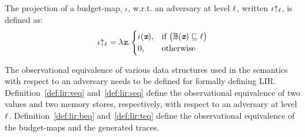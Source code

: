 \begin{mydef}
\label{def:lir:bmp}
The projection of a budget-map, $\iota$, w.r.t. an adversary at
level $\ell$, written $\iota{\uparrow_\ell}$, is defined as:
\begin{align*}
\iota{\uparrow_\ell} = \lambda \emph{\texttt{x}}. 
\begin{cases}
\iota(\emph{\texttt{x}}), &\text{if} ~ \big(\mathbb{B}(\emph{\texttt{x}}) \sqsubseteq \ell\big) \\
0, &\text{otherwise}
\end{cases}
\end{align*}
\end{mydef}


The observational equivalence of various data structures used in the
semantics with respect to an adversary needs to be defined for
formally defining LIR. Definition~\ref{def:lir:veq}
and~\ref{def:lir:seq} define the  observational equivalence of two
values and two memory stores,  respectively, with respect to an
adversary at level $\ell$. Definition~\ref{def:lir:beq}
and~\ref{def:lir:teq} define  the observational equivalence of the
budget-maps and the generated traces. 

